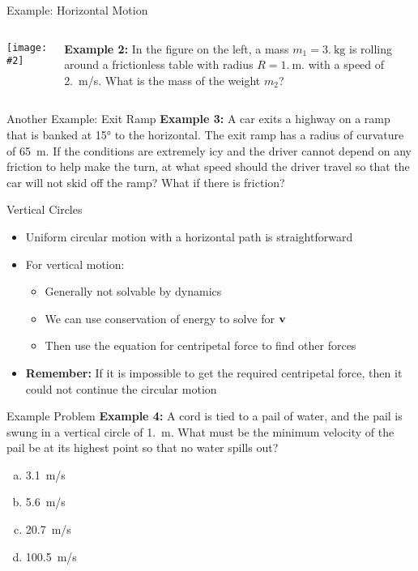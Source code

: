 \documentclass[12pt,compress,aspectratio=169]{beamer}
\newcommand{\pic}[2]{\texttt{[image: \#2]}}
\newcommand{\mb}[1]{\ensuremath\mathbf{#1}}
\begin{document}
\begin{frame}{Example: Horizontal Motion}
  \begin{columns}
    \pic{1}{puck-on-table.jpg}
    
    \textbf{Example 2:} In the figure on the left, a mass $m_1=\SI{3.}{\kg}$ is
    rolling around a frictionless table with radius $R=\SI{1.}{\metre}$. with a
    speed of \SI{2.}{\metre/s}. What is the mass of the weight $m_2$?
  \end{columns}
\end{frame}


\begin{frame}{Another Example: Exit Ramp}
  \textbf{Example 3:} A car exits a highway on a ramp that is banked at
  \ang{15} to the horizontal. The exit ramp has a radius of curvature of
  \SI{65}{\metre}. If the conditions are extremely icy and the driver cannot
  depend on any friction to help make the turn, at what speed should the driver
  travel so that the car will not skid off the ramp? What if there is friction?
\end{frame}


\begin{frame}{Vertical Circles}
  \begin{itemize}
  \item Uniform circular motion with a horizontal path is straightforward
  \item For vertical motion:
    \begin{itemize}
    \item Generally not solvable by dynamics
    \item We can use conservation of energy to solve for $\mb{v}$
    \item Then use the equation for centripetal force to find other forces
    \end{itemize}
  \item\textbf{Remember:} If it is impossible to get the required centripetal
    force, then it could not continue the circular motion
  \end{itemize}
\end{frame}


\begin{frame}{Example Problem}
  \textbf{Example 4:} A cord is tied to a pail of water, and the pail is swung
  in a vertical circle of \SI{1.}{\metre}. What must be the minimum velocity of
  the pail be at its highest point so that no water spills out?

  \begin{enumerate}[(a)]
  \item\SI{3.1}{m/\s}
  \item\SI{5.6}{m/\s}
  \item\SI{20.7}{m/\s}
  \item\SI{100.5}{m/\s}
  \end{enumerate}
\end{frame}
\end{document}
